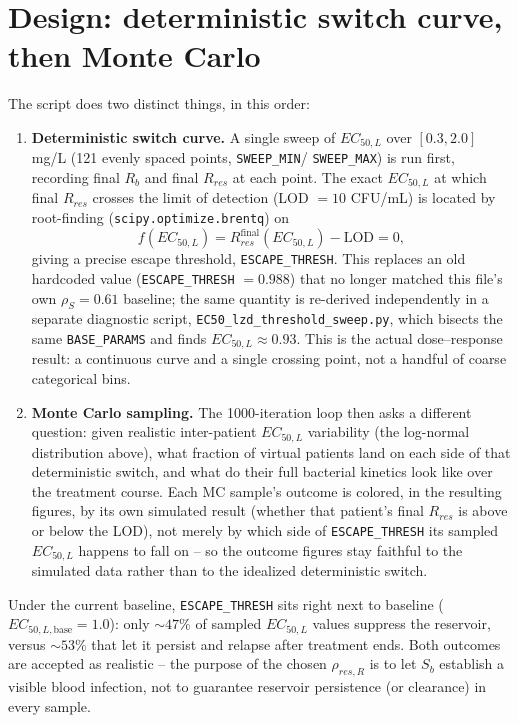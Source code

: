 \documentclass[11pt]{article}
\begin{document}
\section{Design: deterministic switch curve, then Monte Carlo}

The script does two distinct things, in this order:

\begin{enumerate}
\item \textbf{Deterministic switch curve.} A single sweep of $EC_{50,L}$
over $[0.3, 2.0]$ mg/L (121 evenly spaced points, \texttt{SWEEP\_MIN}/
\texttt{SWEEP\_MAX}) is run first, recording final $R_b$ and final $R_{res}$
at each point. The exact $EC_{50,L}$ at which final $R_{res}$ crosses the
limit of detection (LOD $= 10$ CFU/mL) is located by root-finding
(\texttt{scipy.optimize.brentq}) on
\begin{equation}
f(EC_{50,L}) = R_{res}^{\mathrm{final}}(EC_{50,L}) - \mathrm{LOD} = 0,
\end{equation}
giving a precise escape threshold, \texttt{ESCAPE\_THRESH}. This replaces an
old hardcoded value (\texttt{ESCAPE\_THRESH} $=0.988$) that no longer
matched this file's own $\rho_S = 0.61$ baseline; the same quantity is
re-derived independently in a separate diagnostic script,
\texttt{EC50\_lzd\_threshold\_sweep.py}, which bisects the same
\texttt{BASE\_PARAMS} and finds $EC_{50,L} \approx 0.93$. This is the actual
dose--response result: a continuous curve and a single crossing point, not a
handful of coarse categorical bins.

\item \textbf{Monte Carlo sampling.} The 1000-iteration loop then asks a
different question: given realistic inter-patient $EC_{50,L}$ variability
(the log-normal distribution above), what fraction of virtual patients land
on each side of that deterministic switch, and what do their full bacterial
kinetics look like over the treatment course. Each MC sample's outcome is
colored, in the resulting figures, by its own simulated result (whether that
patient's final $R_{res}$ is above or below the LOD), not merely by which
side of \texttt{ESCAPE\_THRESH} its sampled $EC_{50,L}$ happens to fall on --
so the outcome figures stay faithful to the simulated data rather than to
the idealized deterministic switch.
\end{enumerate}

Under the current baseline, \texttt{ESCAPE\_THRESH} sits right next to
baseline ($EC_{50,L,\mathrm{base}} = 1.0$): only $\sim47\%$ of sampled
$EC_{50,L}$ values suppress the reservoir, versus $\sim53\%$ that let it
persist and relapse after treatment ends. Both outcomes are accepted as
realistic -- the purpose of the chosen $\rho_{res,R}$ is to let $S_b$
establish a visible blood infection, not to guarantee reservoir persistence
(or clearance) in every sample.
\end{document}
